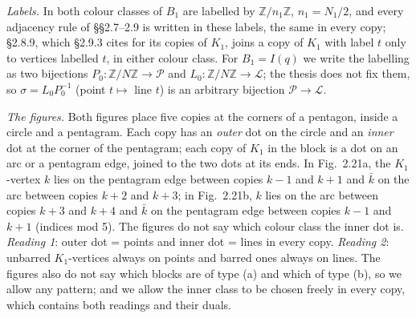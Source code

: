 \documentclass[11pt]{amsart}
\theoremstyle{definition}
\theoremstyle{remark}
\numberwithin{equation}{section}
\newcommand{\Z}{\mathbb Z}
\newcommand{\cL}{\mathcal L}
\newcommand{\cP}{\mathcal P}
\begin{document}
\emph{Labels.} In \cite[\S2.7.1]{Go86} both colour classes of $B_1$ are labelled by $\Z/n_1\Z$, $n_1=N_1/2$, and every
adjacency rule of \S\S2.7--2.9 is written in these labels, the same in every copy; \S2.8.9, which \S2.9.3 cites for its
copies of $K_1$, joins a copy of $K_1$ with label $t$ only to vertices labelled $t$, in either colour class. For $B_1=I(q)$ we
write the labelling as two bijections $P_0:\Z/N\Z\to\cP$ and $L_0:\Z/N\Z\to\cL$; the thesis does not fix them, so
$\sigma=L_0P_0^{-1}$ (point $t\mapsto$ line $t$) is an arbitrary bijection $\cP\to\cL$.

\emph{The figures.} Both figures place five copies at the corners of a pentagon, inside a circle and a pentagram. Each
copy has an \emph{outer} dot on the circle and an \emph{inner} dot at the corner of the pentagram; each copy of $K_1$ in the
block is a dot on an arc or a pentagram edge, joined to the two dots at its ends. In Fig.~2.21a, the $K_1$-vertex $k$ lies on
the pentagram edge between copies $k-1$ and $k+1$ and $\bar k$ on the arc between copies $k+2$ and $k+3$; in Fig.~2.21b, $k$
lies on the arc between copies $k+3$ and $k+4$ and $\bar k$ on the pentagram edge between copies $k-1$ and $k+1$ (indices
mod 5). The figures do not say which colour class the inner dot is. \emph{Reading 1}: outer dot = points and inner dot =
lines in every copy. \emph{Reading 2}: unbarred $K_1$-vertices always on points and barred ones always on lines. The figures
also do not say which blocks are of type (a) and which of type (b), so we allow any pattern; and we allow the inner class to
be chosen freely in every copy, which contains both readings and their duals.
\end{document}
